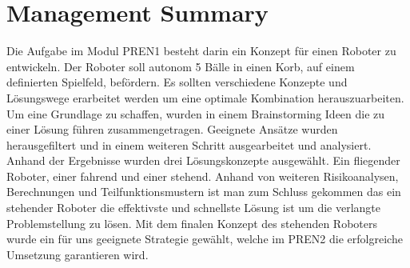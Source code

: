 \section*{Management Summary}
Die Aufgabe im Modul PREN1 besteht darin ein Konzept für einen Roboter zu 
entwickeln. Der Roboter soll autonom 5 Bälle in einen Korb, auf einem 
definierten Spielfeld, befördern. Es sollten verschiedene Konzepte und 
Lösungswege erarbeitet werden um eine optimale Kombination herauszuarbeiten. 
Um eine Grundlage zu schaffen, wurden in einem Brainstorming Ideen die zu 
einer Lösung führen zusammengetragen. Geeignete Ansätze wurden herausgefiltert 
und in einem weiteren Schritt ausgearbeitet und analysiert. Anhand der 
Ergebnisse wurden drei Lösungskonzepte ausgewählt. Ein fliegender Roboter, 
einer fahrend und einer stehend. Anhand von weiteren Risikoanalysen, 
Berechnungen und Teilfunktionsmustern ist man zum Schluss gekommen das ein 
stehender Roboter die effektivste und schnellste Lösung ist um die verlangte 
Problemstellung zu lösen. Mit dem finalen Konzept des stehenden Roboters wurde 
ein für uns geeignete Strategie gewählt, welche im PREN2 die erfolgreiche 
Umsetzung garantieren wird.
